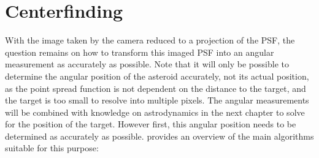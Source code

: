 \section{Centerfinding}
With the image taken by the camera reduced to a projection of the PSF, the question remains on how to transform this imaged PSF into an angular measurement as accurately as possible. Note that it will only be possible to determine the angular position of the asteroid accurately, not its actual position, as the point spread function is not dependent on the distance to the target, and the target is too small to resolve into multiple pixels. The angular measurements will be combined with knowledge on astrodynamics in the next chapter to solve for the position of the target. However first, this angular position needs to be determined as accurately as possible. \cite{OpNav} provides an overview of the main algorithms suitable for this purpose:\\

